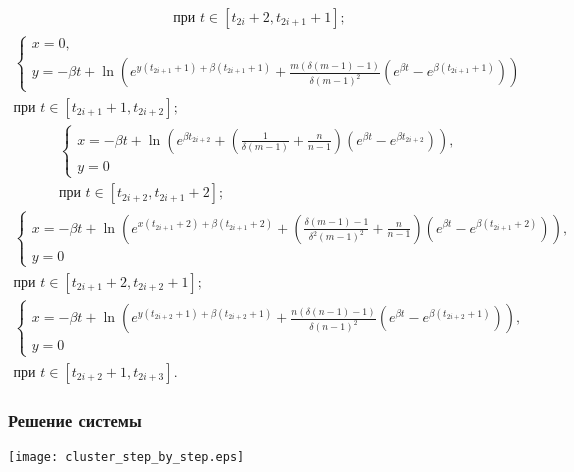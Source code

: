 \begin{frame}[allowframebreaks]
\begin{multline*}
		\text{при } t \in [t_{2i} + 2, t_{2i + 1} + 1];
	\end{multline*}
	\begin{multline*}
		\begin{cases}
			x = 0,\\
			y = -\beta t + \ln\left(e^{y(t_{2i + 1} + 1) + \beta(t_{2i + 1} + 1)} + \frac{m (\delta (m - 1) - 1)}{\delta (m - 1)^2} (e^{\beta t} - e^{\beta (t_{2i + 1} + 1)}) \right)
		\end{cases}\\
		\text{при } t \in [t_{2i + 1} + 1, t_{2i + 2}];
	\end{multline*}
	\begin{multline*}
		\begin{cases}
			x = -\beta t + \ln\left(e^{\beta t_{2i + 2}} + \left(\frac{1}{\delta(m - 1)} + \frac{n}{n - 1}\right) (e^{\beta t} - e^{\beta t_{2i + 2}})\right),\\
			y = 0
		\end{cases}\\
		\text{при } t \in [t_{2i + 2}, t_{2i + 1} + 2];
	\end{multline*}
	\begin{multline*}
		\begin{cases}
			x = -\beta t + \ln\left(e^{x(t_{2i + 1} + 2) + \beta (t_{2i + 1} + 2)} + \left(\frac{\delta(m - 1) - 1}{\delta^2 (m - 1)^2} + \frac{n}{n - 1}\right) (e^{\beta t} - e^{\beta (t_{2i + 1} + 2)})\right),\\
			y = 0
		\end{cases}\\
		\text{при } t \in [t_{2i + 1} + 2, t_{2i + 2} + 1];
	\end{multline*}
	\begin{multline*}
		\begin{cases}
			x = -\beta t + \ln\left(e^{y(t_{2i + 2} + 1) + \beta(t_{2i + 2} + 1)} + \frac{n (\delta(n - 1) - 1)}{\delta (n - 1)^2} (e^{\beta t} - e^{\beta (t_{2i + 2} + 1)}) \right),\\
			y = 0
		\end{cases}\\
		\text{при } t \in [t_{2i + 2} + 1, t_{2i + 3}].
	\end{multline*}
	\normalsize
\end{frame}

\begin{frame}
	\frametitle{Решение системы}
	\texttt{[image: cluster\_step\_by\_step.eps]}
\end{frame}


